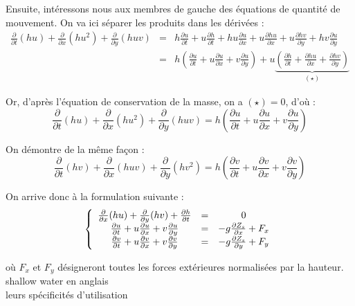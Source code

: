 Ensuite, intéressons nous aux membres de gauche des équations de quantité de mouvement. On va ici séparer les produits dans les dérivées :
\begin{eqnarray*}
	\frac{\partial}{\partial t}(hu) + \frac{\partial}{\partial x} (hu^2) + \frac{\partial}{\partial y}(huv) &=& h\frac{\partial u}{\partial t} + u\frac{\partial h}{\partial t} + hu\frac{\partial u}{\partial x} + u\frac{\partial hu}{\partial x} + u\frac{\partial hv}{\partial y} + hv\frac{\partial u}{\partial y} \\
														&=& h\left(\frac{\partial u}{\partial t} + u\frac{\partial u}{\partial x} + v\frac{\partial u}{\partial y} \right) + u\underbrace{\left(\frac{\partial h}{\partial t} + \frac{\partial hu}{\partial x} + \frac{\partial hv}{\partial y} \right)}_{(\star)}
\end{eqnarray*}

Or, d'après l'équation de conservation de la masse, on a $(\star)=0$, d'où :
\[\frac{\partial}{\partial t}(hu) + \frac{\partial}{\partial x} (hu^2) + \frac{\partial}{\partial y}(huv) = h\left(\frac{\partial u}{\partial t} + u\frac{\partial u}{\partial x} + v\frac{\partial u}{\partial y} \right)\]

On démontre de la même façon : 
\[\frac{\partial}{\partial t}(hv) + \frac{\partial}{\partial x} (huv) + \frac{\partial}{\partial y}(hv^2)=h\left( \frac{\partial v}{\partial t} + u\frac{\partial v}{\partial x} + v\frac{\partial v}{\partial y}\right)\]

On arrive donc à la formulation suivante :
\begin{equation} \label{II-2-4-3}
	\left\{ \begin{array}{c c c}
	\frac{\partial}{\partial x} (hu) + \frac{\partial}{\partial y} (hv) + \frac{\partial h}{\partial t} &=& 0 \\
      \frac{\partial u}{\partial t} + u\frac{\partial u}{\partial x} + v\frac{\partial u}{\partial y} &=& -g\frac{\partial Z_s}{\partial x} + F_x\\
	 \frac{\partial v}{\partial t} + u\frac{\partial v}{\partial x} + v\frac{\partial v}{\partial y}&=& -g\frac{\partial Z_s}{\partial y} + F_y
	\end{array}\right.
\end{equation}

où $F_x$ et $F_y$ désigneront toutes les forces extérieures normalisées par la hauteur. \\
shallow water en anglais\\
leurs spécificités d'utilisation\\

